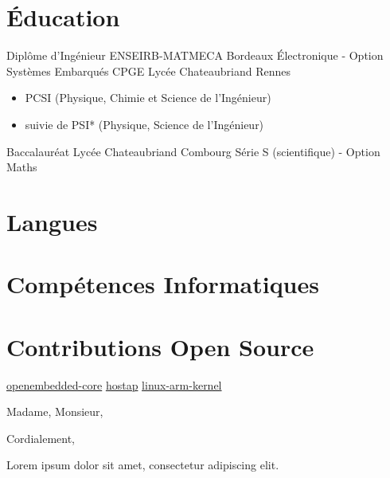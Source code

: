 \documentclass[11pt,a4paper,sans]{moderncv}
\begin{document}
\section{Éducation}
	{Diplôme d'Ingénieur}
	{ENSEIRB-MATMECA}
	{Bordeaux}
	{}
	{Électronique - Option Systèmes Embarqués}
	{CPGE}
	{Lycée Chateaubriand}
	{Rennes}
	{}
	{
		\begin{itemize}
		\item PCSI (Physique, Chimie et Science de l'Ingénieur)
		\item suivie de PSI* (Physique, Science de l'Ingénieur)
		\end{itemize}
	}
	{Baccalauréat}
	{Lycée Chateaubriand}
	{Combourg}
	{}
	{Série S (scientifique) - Option Maths}

\section{Langues}

\section{Compétences Informatiques}

\section{Contributions Open Source}
		 {\href{https://git.openembedded.org/openembedded-core/log/?qt=grep&q=lemetayer}{openembedded-core}}
		 {\href{https://w1.fi/cgit/hostap/log/?qt=grep&q=lemetayer}{hostap}}
		 {\href{http://lists.infradead.org/pipermail/linux-arm-kernel/2010-March/012556.html}{linux-arm-kernel}}

\clearpage

\date{01 Janvier, 2000}
\opening{Madame, Monsieur,}
\closing{Cordialement,}
\makelettertitle

\onehalfspacing
\setlength{\parskip}{2.5em}

Lorem ipsum dolor sit amet, consectetur adipiscing elit.

\makeletterclosing
\end{document}
